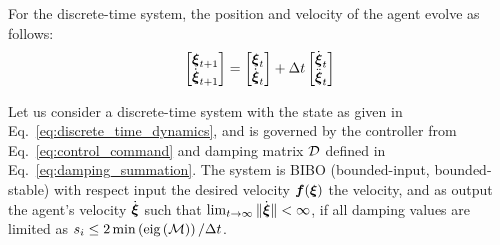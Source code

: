 For the discrete-time system, the position and velocity of the agent evolve as follows:
\begin{equation}
	\begin{bmatrix}
	 \vecs \xi_{t+1} \\ \dot{\vecs \xi}_{t+1}
	\end{bmatrix}
	=
	\begin{bmatrix}
	 \vecs \xi_{t} \\ \dot{\vecs \xi}_{t}
	\end{bmatrix}
	+ 
	\Delta t 
	\begin{bmatrix}
		\dot{\vecs \xi}_{t} \\ \ddot{\vecs \xi}_t 
	\end{bmatrix}
	\label{eq:discrete_time_dynamics}
\end{equation}

\begin{lemma}
	Let us consider a discrete-time system with the state as given in Eq.~\eqref{eq:discrete_time_dynamics}, and is governed by the controller from Eq.~\eqref{eq:control_command} and damping matrix $\mathcal{D}$ defined in Eq.~\eqref{eq:damping_summation}.
	The system is BIBO (bounded-input, bounded-stable) with respect input the desired velocity $\boldsymbol{f}(\boldsymbol{\xi})$ the velocity, and as output the agent's velocity $\dot{\boldsymbol{\xi}}$ such that $\lim_{t \rightarrow \infty} \| \dot{\boldsymbol{\xi}} \| < \infty$, if all damping values are limited as $s_{i} \leq 2 \min \left( \text{eig}\left(\mathcal{M}\right)  \right) / \Delta t$.
\end{lemma}

